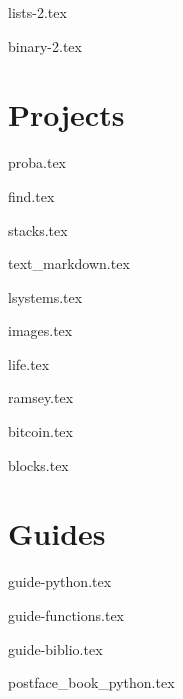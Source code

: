 \documentclass[11pt]{report}
\begin{document}
{lists-2.tex}

{binary-2.tex}



\part{Projects}

{proba.tex}

{find.tex}

{stacks.tex}

{text_markdown.tex}

{lsystems.tex}

{images.tex}

{life.tex}

{ramsey.tex}

{bitcoin.tex}

{blocks.tex}


\part{Guides}

{guide-python.tex}

{guide-functions.tex}

{guide-biblio.tex} 



\clearemptydoublepage


{postface_book_python.tex}

\vfill
\bigskip
\bigskip

\end{document}
